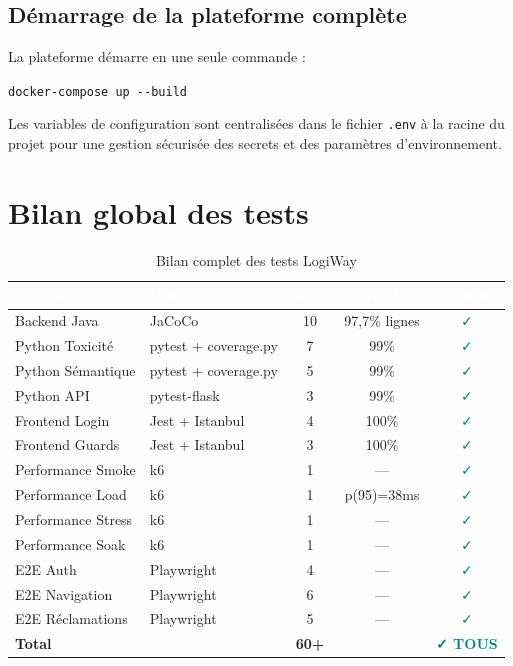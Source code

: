 \documentclass[12pt,a4paper]{report}
\newcommand{\thead}[1]{\cellcolor{tablehead}\textcolor{white}{\textbf{#1}}}
\begin{document}
\subsection{Démarrage de la plateforme complète}

La plateforme démarre en une seule commande :

\begin{tcolorbox}[ruleframe]
\texttt{docker-compose up -{}-build}
\end{tcolorbox}

Les variables de configuration sont centralisées dans le fichier
\texttt{.env} à la racine du projet pour une gestion sécurisée des
secrets et des paramètres d'environnement.

\section{Bilan global des tests}
\label{sec:ch8-bilan}

\begin{table}[H]
  \centering
  \caption{Bilan complet des tests LogiWay}
  \label{tab:bilan_tests}
  \begin{tabularx}{\textwidth}{|l|l|c|c|c|}
    \hline
    \thead{Couche} & \thead{Outil} & \thead{Tests} & \thead{Couverture} & \thead{Statut} \\
    \hline
    Backend Java & JaCoCo & 10 & 97,7\% lignes & \textcolor{teal}{✓} \\
    Python Toxicité & pytest + coverage.py & 7 & 99\% & \textcolor{teal}{✓} \\
    Python Sémantique & pytest + coverage.py & 5 & 99\% & \textcolor{teal}{✓} \\
    Python API & pytest-flask & 3 & 99\% & \textcolor{teal}{✓} \\
    Frontend Login & Jest + Istanbul & 4 & 100\% & \textcolor{teal}{✓} \\
    Frontend Guards & Jest + Istanbul & 3 & 100\% & \textcolor{teal}{✓} \\
    Performance Smoke & k6 & 1 & --- & \textcolor{teal}{✓} \\
    Performance Load & k6 & 1 & p(95)=38ms & \textcolor{teal}{✓} \\
    Performance Stress & k6 & 1 & --- & \textcolor{teal}{✓} \\
    Performance Soak & k6 & 1 & --- & \textcolor{teal}{✓} \\
    E2E Auth & Playwright & 4 & --- & \textcolor{teal}{✓} \\
    E2E Navigation & Playwright & 6 & --- & \textcolor{teal}{✓} \\
    E2E Réclamations & Playwright & 5 & --- & \textcolor{teal}{✓} \\
    \hline
    \textbf{Total} & & \textbf{60+} & & \textcolor{teal}{\textbf{✓ TOUS}} \\
    \hline
  \end{tabularx}
\end{table}
\end{document}
